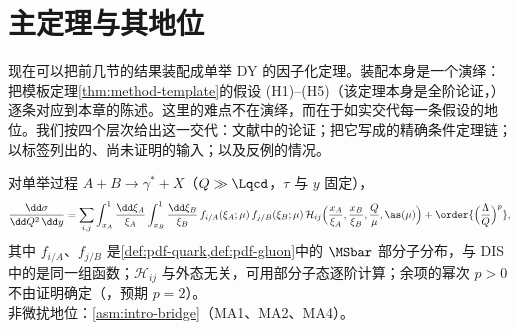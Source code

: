 \section{主定理与其地位}\label{sec:dy-theorem}

现在可以把前几节的结果装配成单举 DY 的因子化定理。装配本身是一个演绎：把模板定理\cref{thm:method-template}的假设 (H1)--(H5)（该定理本身是全阶论证，\tagA）逐条对应到本章的陈述。这里的难点不在演绎，而在于如实交代每一条假设的地位。我们按四个层次给出这一交代：文献中的论证；把它写成的精确条件定理链；以标签列出的、尚未证明的输入；以及反例的情况。

\begin{theorem}\label{thm:dy-factorization}
对单举过程 $A+B\to\gamma^*+X$（$Q\gg\Lqcd$，$\tau$ 与 $y$ 固定），
\begin{equation}\label{eq:dy-factorization}
\frac{\dd\sigma}{\dd Q^2\,\dd y}=\sum_{i,j}\int_{x_A}^1\frac{\dd\xi_A}{\xi_A}\int_{x_B}^1\frac{\dd\xi_B}{\xi_B}\,f_{i/A}(\xi_A;\mu)\,f_{j/B}(\xi_B;\mu)\,\mathcal H_{ij}\Big(\frac{x_A}{\xi_A},\frac{x_B}{\xi_B},\frac Q\mu,\as(\mu)\Big)+\order{\Big(\frac{\Lambda}{Q}\Big)^p},
\end{equation}
其中 $f_{i/A}$、$f_{j/B}$ 是\cref{def:pdf-quark,def:pdf-gluon}中的 $\MSbar$ 部分子分布，与 DIS 中的是同一组函数；$\mathcal H_{ij}$ 与外态无关，可用部分子态逐阶计算；余项的幂次 $p>0$ 不由证明确定（\tagC，预期 $p=2$）。\\
非微扰地位：\cref{asm:intro-bridge}（MA1、MA2、MA4）。
\end{theorem}

